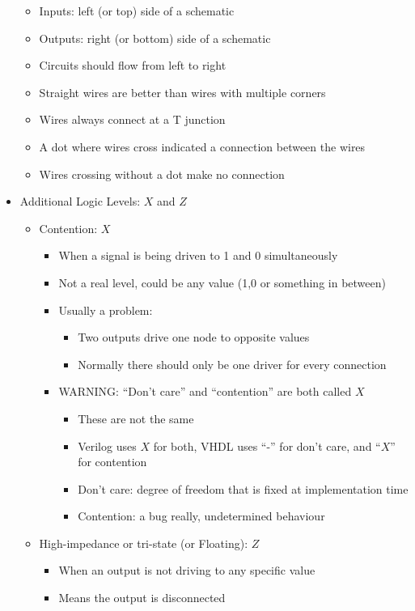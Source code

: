 \documentclass[a4paper]{article}
\begin{document}
\begin{itemize}
\begin{itemize}
\item Inputs: left (or top) side of a schematic
\item Outputs: right (or bottom) side of a schematic
\item Circuits should flow from left to right
\item Straight wires are better than wires with multiple corners
\item Wires always connect at a T junction
\item A dot where wires cross indicated a connection between the wires
\item Wires crossing without a dot make no connection
\end{itemize}
\item Additional Logic Levels: $X$ and $Z$
\begin{itemize}
\item Contention: $X$
\begin{itemize}
\item When a signal is being driven to 1 and 0 simultaneously
\item Not a real level, could be any value (1,0 or something in between)
\item Usually a problem:
\begin{itemize}
\item Two outputs drive one node to opposite values
\item Normally there should only be one driver for every connection
\end{itemize}
\item WARNING: ``Don't care'' and ``contention'' are both called $X$
\begin{itemize}
\item These are not the same
\item Verilog uses $X$ for both, VHDL uses ``-'' for don't care, and ``$X$'' for contention
\item Don't care: degree of freedom that is fixed at implementation time
\item Contention: a bug really, undetermined behaviour
\end{itemize}
\end{itemize}
\item High-impedance or tri-state (or Floating): $Z$
\begin{itemize}
\item When an output is not driving to any specific value
\item Means the output is disconnected

\end{itemize}
\end{itemize}
\end{itemize}
\end{document}
